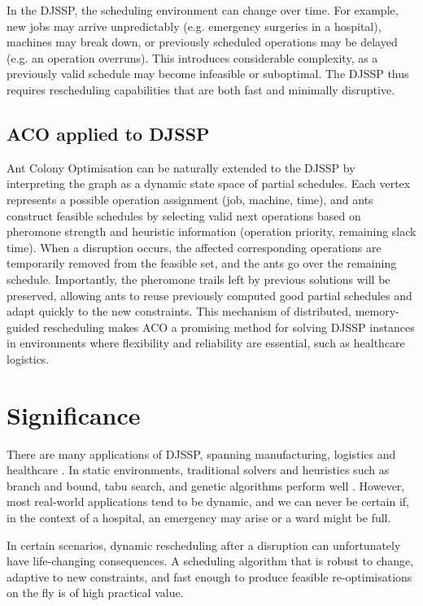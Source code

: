 \documentclass[final-report]{report-template}
\begin{document}
In the DJSSP, the scheduling environment can change over time. For example, new jobs may arrive unpredictably (e.g. emergency surgeries in a hospital), machines may break down, or previously scheduled operations may be delayed (e.g. an operation overruns). This introduces considerable complexity, as a previously valid schedule may become infeasible or suboptimal. The DJSSP thus requires rescheduling capabilities that are both fast and minimally disruptive.

\subsection{ACO applied to DJSSP}

Ant Colony Optimisation can be naturally extended to the DJSSP by interpreting the graph as a dynamic state space of partial schedules. Each vertex represents a possible operation assignment (job, machine, time), and ants construct feasible schedules by selecting valid next operations based on pheromone strength and heuristic information (operation priority, remaining slack time). When a disruption occurs, the affected corresponding operations are temporarily removed from the feasible set, and the ants go over the remaining schedule. Importantly, the pheromone trails left by previous solutions will be preserved, allowing ants to reuse previously computed good partial schedules and adapt quickly to the new constraints. This mechanism of distributed, memory-guided rescheduling makes ACO a promising method for solving DJSSP instances in environments where flexibility and reliability are essential, such as healthcare logistics.

\section{Significance}
There are many applications of DJSSP, spanning manufacturing, logistics \cite{jssp-manufacturing} and healthcare \cite{jssp-healthcare}. In static environments, traditional solvers and heuristics such as branch and bound, tabu search, and genetic algorithms perform well \cite{Wouda_Lan_Kool_PyVRP_2024}. However, most real-world applications tend to be dynamic, and we can never be certain if, in the context of a hospital, an emergency may arise or a ward might be full.

In certain scenarios, dynamic rescheduling after a disruption can unfortunately have life-changing consequences. A scheduling algorithm that is robust to change, adaptive to new constraints, and fast enough to produce feasible re-optimisations on the fly is of high practical value.
\end{document}
